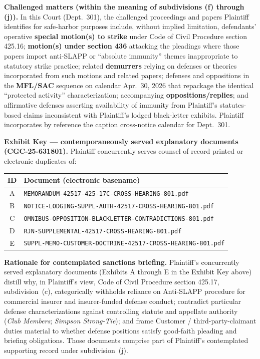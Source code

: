 \textbf{Challenged matters (within the meaning of subdivisions (f) through (j)).} In this Court (Dept.\ 301), the challenged proceedings and papers Plaintiff identifies for safe-harbor purposes include, without implied limitation, defendants' operative \textbf{special motion(s) to strike} under Code of Civil Procedure section 425.16; \textbf{motion(s) under section 436} attacking the pleadings where those papers import anti-SLAPP or ``absolute immunity'' themes inappropriate to statutory strike practice; related \textbf{demurrers} relying on defenses or theories incorporated from such motions and related papers; defenses and oppositions in the \textbf{MFL/SAC} sequence on calendar Apr.\ 30, 2026 that repackage the identical ``protected activity'' characterization; accompanying \textbf{oppositions/replies}; and affirmative defenses asserting availability of immunity from Plaintiff's statutes-based claims inconsistent with Plaintiff's lodged black-letter exhibits. Plaintiff incorporates by reference the caption cross-notice calendar for Dept.\ 301.

\textbf{Exhibit Key --- contemporaneously served explanatory documents (CGC-25-631801).} Plaintiff concurrently serves counsel of record printed or electronic duplicates of:\par
\begin{tabular}{cl}
\textbf{ID} & \textbf{Document (electronic basename)} \\ \hline
A & \texttt{MEMORANDUM-42517-425-17C-CROSS-HEARING-801.pdf} \\
B & \texttt{NOTICE-LODGING-SUPPL-AUTH-42517-CROSS-HEARING-801.pdf} \\
C & \texttt{OMNIBUS-OPPOSITION-BLACKLETTER-CONTRADICTIONS-801.pdf} \\
D & \texttt{RJN-SUPPLEMENTAL-42517-CROSS-HEARING-801.pdf} \\
E & \texttt{SUPPL-MEMO-CUSTOMER-DOCTRINE-42517-CROSS-HEARING-801.pdf}
\end{tabular}

\textbf{Rationale for contemplated sanctions briefing.} Plaintiff's concurrently served explanatory documents (Exhibits A through E in the Exhibit Key above) distill why, in Plaintiff's view, Code of Civil Procedure section 425.17, subdivision~(c), categorically withholds reliance on Anti-SLAPP procedure for commercial insurer and insurer-funded defense conduct; contradict particular defense characterizations against controlling statute and appellate authority (\textit{Club Members}; \textit{Simpson Strong-Tie}); and frame Customer / third-party-claimant duties material to whether defense positions satisfy good-faith pleading and briefing obligations. Those documents comprise part of Plaintiff's contemplated supporting record under subdivision~(j).

